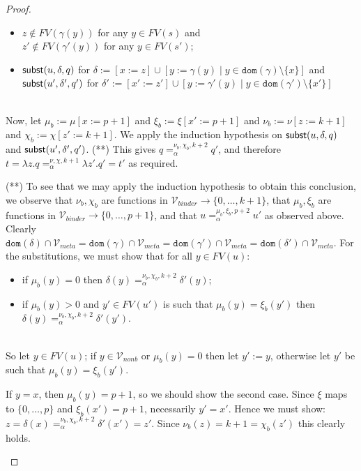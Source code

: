 \documentclass{lmcs}
\theoremstyle{theorem}\newtheorem{theorem}{Theorem}
\theoremstyle{theorem}\newtheorem{lemma}[theorem]{Lemma}
\theoremstyle{theorem}\newtheorem{corollary}[theorem]{Corollary}
\theoremstyle{definition}\newtheorem{definition}[theorem]{Definition}
\theoremstyle{definition}\newtheorem{example}[theorem]{Example}
\newcommand{\Vmeta}{\mathcal{V}_{\mathit{meta}}}
\newcommand{\Vfree}{\mathcal{V}_{\mathit{nonb}}}
\newcommand{\Vbound}{\mathcal{V}_{\mathit{binder}}}
\newcommand{\FV}{\mathit{FV}}
\newcommand{\domain}{\mathtt{dom}}
\newcommand{\abs}[2]{\lambda #1.#2}
\begin{document}
\begin{proof}
{\begin{itemize}
\begin{itemize}
        \begin{itemize}
        \item $z \notin \FV(\gamma(y))$ for any $y \in \FV(s)$ and \\
          $z' \notin \FV(\gamma'(y))$ for any $y \in \FV(s')$;
        \item $\mathsf{subst}(u,\delta,q)$ for $\delta := [x:=z] \cup [y:=\gamma(y) \mid y \in \domain(\gamma) \setminus \{x\}]$ and \\
          $\mathsf{subst}(u',\delta',q')$ for $\delta' := [x':=z'] \cup [y:=\gamma'(y) \mid y \in \domain(\gamma') \setminus \{x'\}]$
        \end{itemize}
      \end{itemize}
      \ \\
      Now, let $\mu_b := \mu[x:=p+1]$ and $\xi_b := \xi[x':=p+1]$ and $\nu_b := \nu[z:=k+1]$ and $\chi_b := \chi[z':=k+1]$.
      We apply the induction hypothesis on $\mathsf{subst}(u,\delta,q)$ and $\mathsf{subst}(u',\delta',q')$. (**)
      This gives $q =_\alpha^{\nu_b,\chi_b,k+2} q'$, and therefore $t = \abs{z}{q} =_\alpha^{\nu,\chi,k+1} \abs{z'}{q'} = t'$ as required.
    
      (**) To see that we may apply the induction hypothesis to obtain this conclusion, we observe that
      $\nu_b,\chi_b$ are functions in $\Vbound \to \{0,\dots,k+1\}$, that $\mu_b,\xi_b$ are functions in $\Vbound \to \{0,\dots,p+1\}$,
      and that $u =_\alpha^{\mu_b,\xi_b,p+2} u'$ as observed above.
      Clearly $\domain(\delta) \cap \Vmeta = \domain(\gamma) \cap \Vmeta = \domain(\gamma') \cap \Vmeta = \domain(\delta') \cap \Vmeta$.
      For the substitutions, we must show that for all $y \in \FV(u)$:
      \begin{itemize}
      \item if $\mu_b(y) = 0$ then $\delta(y) =_\alpha^{\nu_b,\chi_b,k+2} \delta'(y)$;
      \item if $\mu_b(y) > 0$ and $y' \in \FV(u')$ is such that $\mu_b(y) = \xi_b(y')$ then $\delta(y) =_\alpha^{\nu_b,\chi_b,k+2} \delta'(y')$.
      \end{itemize}
      \ \\
      So let $y \in \FV(u)$; if $y \in \Vfree$ or $\mu_b(y) = 0$ then let $y' := y$, otherwise let $y'$ be such that $\mu_b(y) = \xi_b(y')$.
    
      If $y = x$, then $\mu_b(y) = p + 1$, so we should show the second case.
      Since $\xi$ maps to $\{0,\dots,p\}$ and $\xi_b(x') = p + 1$, necessarily $y' = x'$.
      Hence we must show: $z = \delta(x) =_\alpha^{\nu_b,\chi_b,k+2} \delta'(x') = z'$.
      Since $\nu_b(z) = k + 1 = \chi_b(z')$ this clearly holds.
    

\end{itemize}}
\end{proof}
\end{document}
